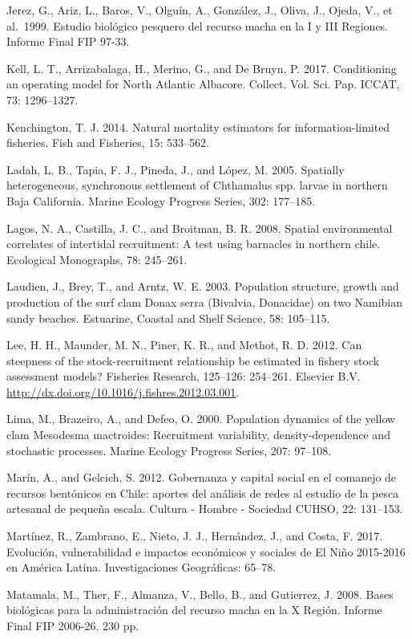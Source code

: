 \documentclass[12pt]{article}
\begin{document}
Jerez, G., Ariz, L., Baros, V., Olguín, A., González, J., Oliva, J.,
Ojeda, V., et al.~1999. Estudio biológico pesquero del recurso macha en
la I y III Regiones. Informe Final FIP 97-33.

Kell, L. T., Arrizabalaga, H., Merino, G., and De Bruyn, P. 2017.
Conditioning an operating model for North Atlantic Albacore. Collect.
Vol. Sci. Pap. ICCAT, 73: 1296--1327.

Kenchington, T. J. 2014. Natural mortality estimators for
information-limited fisheries. Fish and Fisheries, 15: 533--562.

Ladah, L. B., Tapia, F. J., Pineda, J., and López, M. 2005. Spatially
heterogeneous, synchronous settlement of Chthamalus spp. larvae in
northern Baja California. Marine Ecology Progress Series, 302: 177--185.

Lagos, N. A., Castilla, J. C., and Broitman, B. R. 2008. Spatial
environmental correlates of intertidal recruitment: A test using
barnacles in northern chile. Ecological Monographs, 78: 245--261.

Laudien, J., Brey, T., and Arntz, W. E. 2003. Population structure,
growth and production of the surf clam Donax serra (Bivalvia, Donacidae)
on two Namibian sandy beaches. Estuarine, Coastal and Shelf Science, 58:
105--115.

Lee, H. H., Maunder, M. N., Piner, K. R., and Methot, R. D. 2012. Can
steepness of the stock-recruitment relationship be estimated in fishery
stock assessment models? Fisheries Research, 125--126: 254--261.
Elsevier B.V. \url{http://dx.doi.org/10.1016/j.fishres.2012.03.001}.

Lima, M., Brazeiro, A., and Defeo, O. 2000. Population dynamics of the
yellow clam Mesodesma mactroides: Recruitment variability,
density-dependence and stochastic processes. Marine Ecology Progress
Series, 207: 97--108.

Marín, A., and Gelcich, S. 2012. Gobernanza y capital social en el
comanejo de recursos bentónicos en Chile: aportes del análisis de redes
al estudio de la pesca artesanal de pequeña escala. Cultura - Hombre -
Sociedad CUHSO, 22: 131--153.

Martínez, R., Zambrano, E., Nieto, J. J., Hernández, J., and Costa, F.
2017. Evolución, vulnerabilidad e impactos económicos y sociales de El
Niño 2015-2016 en América Latina. Investigaciones Geográficas: 65--78.

Matamala, M., Ther, F., Almanza, V., Bello, B., and Gutierrez, J. 2008.
Bases biológicas para la administración del recurso macha en la X
Región. Informe Final FIP 2006-26. 230 pp.
\end{document}

